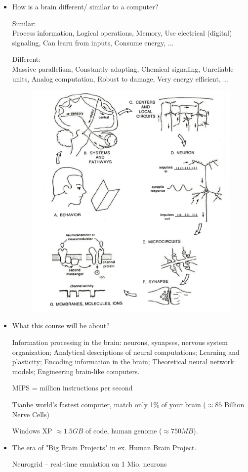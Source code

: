 \documentclass[english,11pt]{article}
\begin{document}
\begin{itemize}
\newpage
\item How is a brain different/ similar to a computer?

Similar: \\ Process information, Logical operations, Memory, Use electrical (digital) signaling, Can learn from inputs, Consume energy,
 ...

Different:\\ Massive parallelism, Constantly adapting, Chemical signaling, Unreliable units, Analog computation, Robust to damage, Very energy efficient, ...

\begin{figure}[htbp]
\centering
  \includegraphics[scale=0.7]{images/1_3.jpg}
  \label{fig:1_3}
\end{figure} 

\newpage
\item What this course will be about?

Information processing in the brain: neurons,
synapses, nervous system organization;
Analytical descriptions of neural computations;
Learning and plasticity;
Encoding information in the brain;
Theoretical neural network models;
Engineering brain-like computers.

MIPS = million instructions per second

Tianhe world's fastest computer, match only 1\% of your brain ($\approx 85$ Billion Nerve Cells)

Windows XP $\approx 1.5 GB $ of code, human genome ($\approx 750 MB$).

\item The era of "Big Brain Projects" in ex. Human Brain Project. 

Neurogrid -- real-time emulation on 1 Mio. neurons

\end{itemize}
\end{document}
